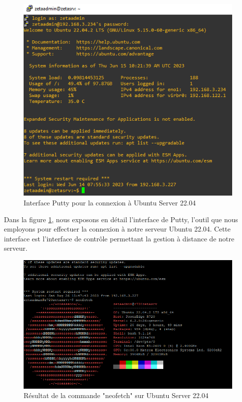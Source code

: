 \begin{figure}[H]
  \centering
  \includegraphics[width=15cm]{Images/zetaserver.png}
  \caption{Interface Putty pour la connexion à Ubuntu Server 22.04}
  \label{fig:putty-interface}
\end{figure}

Dans la figure \ref{fig:putty-interface}, nous exposons en détail l'interface de Putty, l'outil que nous employons pour effectuer la connexion à notre serveur Ubuntu 22.04. Cette interface est l'interface de contrôle permettant la gestion à distance de notre serveur.

\begin{figure}[H]
  \centering
  \includegraphics[width=15cm]{Images/neofetchzetasrv1.png}
  \caption{Résultat de la commande "neofetch" sur Ubuntu Server 22.04}
  \label{fig:neofetch-result}
\end{figure}

